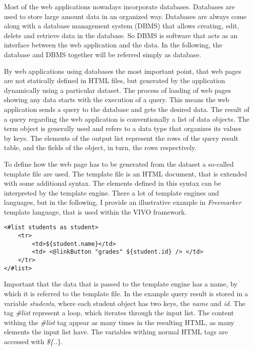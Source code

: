 Most of the web applications nowadays incorporate databases. Databases are used to store large amount data in an organized way. Databases are always come along with a database management system (DBMS) that allows creating, edit, delete and retrieve data in the database. So DBMS is software that acts as an interface between the web application and the data. In the following, the database and DBMS together will be referred simply as database.  

By web applications using databases the most important point, that web pages are not statically defined in HTML files, but generated by the application dynamically using a particular dataset. The process of loading of web pages showing any data starts with the execution of a query. This means the web application sends a query to the database and gets the desired data. The result of a query regarding the web application is conventionally a list of data objects. The term object is generally used and refers to a data type that organizes its values by keys. The elements of the output list represent the rows of the query result table, and the fields of the object, in turn, the rows respectively. 

To define how the web page has to be generated from the dataset a so-called template file are used. The template file is an HTML document, that is extended with some additional syntax. The elements defined in this syntax can be interpreted by the template engine. There a lot of template engines and languages, but in the following, I provide an illustrative example in \textit{Freemarker} template language, that is used within the VIVO framework.

\newpage
\begin{lstlisting}[captionpos=b, caption=Template file example, label=skullJSON, belowskip=1em, aboveskip=2em,
basicstyle=\footnotesize,frame=single]
<#list students as student>
	<tr>
		<td>${student.name}</td>
		<td> <@linkButton "grades" ${student.id} /> </td>
	</tr>
</#list>
\end{lstlisting}

Important that the data that is passed to the template engine has a name, by which it is referred to the template file. In the example query result is stored in a variable \textit{students}, where each student object has two keys, the \textit{name} and \textit{id}. The tag \textit{\#list} represent a loop, which iterates through the input list. The content withing the \textit{\#list} tag appear as many times in the resulting HTML, as many elements the input list have. The variables withing normal HTML tags are accessed with \textit{\$\{..}\}. 


